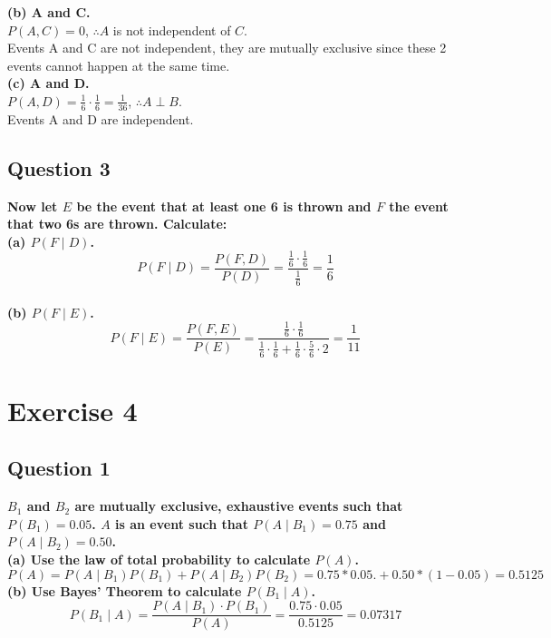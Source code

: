 \documentclass[
]{book}
\begin{document}
\textbf{(b) A and C.}\\
\(P(A,C) = 0\), \(\therefore A\) is not independent of \(C\).\\
Events A and C are not independent, they are mutually exclusive since these 2 events cannot happen at the same time.\\

\textbf{(c) A and D.}\\
\(P(A,D) = \frac{1}{6} \cdot \frac{1}{6} = \frac{1}{36}\), \(\therefore A \perp B\).\\
Events A and D are independent.

\section{Question 3}\label{question-3-1}

\textbf{Now let \(E\) be the event that at least one 6 is thrown and \(F\) the event that two 6s are thrown. Calculate:}\\
\textbf{(a) \(P(F \mid D)\).}\\
\[P(F \mid D) = \frac{P(F,D)}{P(D)} = \frac{\frac{1}{6} \cdot \frac{1}{6}}{\frac{1}{6}} = \frac{1}{6}\]\\
\textbf{(b) \(P(F \mid E)\).}\\
\[P(F \mid E) = \frac{P(F,E)}{P(E)} = \frac{\frac{1}{6} \cdot \frac{1}{6}}{\frac{1}{6} \cdot \frac{1}{6} + \frac{1}{6} \cdot \frac{5}{6} \cdot 2} = \frac{1}{11}\]

\chapter{Exercise 4}\label{exercise-4}

\section{Question 1}\label{question-1-2}

\textbf{\(B_1\) and \(B_2\) are mutually exclusive, exhaustive events such that \(P(B_1) = 0.05\). \(A\) is an event such that \(P(A \mid B_1) = 0.75\) and \(P(A \mid B_2) = 0.50\).}\\
\textbf{(a) Use the law of total probability to calculate \(P(A)\).}\\
\[P(A) = P(A \mid B_1)P(B_1) + P(A \mid B_2)P(B_2) = 0.75 * 0.05. + 0.50 * (1 - 0.05) = 0.5125\]
\textbf{(b) Use Bayes' Theorem to calculate \(P(B_1 \mid A)\).}\\
\[P(B_1 \mid A) = \frac{P(A \mid B_1) \cdot P(B_1)}{P(A)} = \frac{0.75 \cdot 0.05}{0.5125} = 0.07317\]
\end{document}
